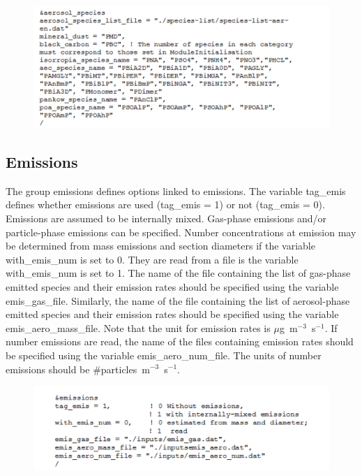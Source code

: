 \documentclass[a4paper,11pt]{article}
\begin{document}
\begin{figure}[H]
        \begin{center}
                \includegraphics[angle=0,width=\textwidth]{fig/aerosolspecies.png}
        \end{center}
\end{figure}


\subsection{Emissions}

The group emissions defines options linked to emissions. The variable tag\_emis defines whether emissions are used (tag\_emis = 1) or not (tag\_emis = 0). Emissions are assumed to be internally mixed. Gas-phase emissions and/or particle-phase emissions can be specified. Number concentrations at emission may be determined from mass emissions and section diameters if the variable with\_emis\_num is set to 0. They are read from a file is the variable with\_emis\_num is set to 1. 
The name of the file containing the list of gas-phase emitted species and their emission rates should be specified using the variable emis\_gas\_file. Similarly, the name of the file containing the list of aerosol-phase emitted species and their emission rates should be specified using the variable emis\_aero\_mass\_file. Note that the unit for emission rates is $\mu$g~m$^{-3}$~s$^{-1}$. If number emissions are read, the name of the files containing emission rates should be specified using the variable emis\_aero\_num\_file. The units of number emissions should be \#particles~m$^{-3}$~s$^{-1}$.

\begin{figure}[H]
        \begin{center}
                \includegraphics[angle=0,width=\textwidth]{fig/emissions.png}
        \end{center}
\end{figure}
\end{document}
